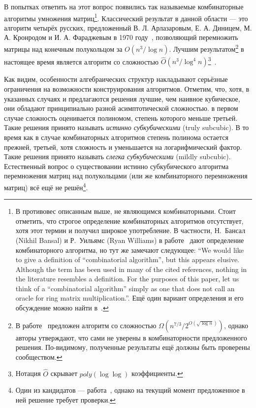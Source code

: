 В попытках ответить на этот вопрос появились так называемые комбинаторные алгоритмы умножения матриц\footnote{В противовес описанным выше, не являющимся комбинаторными. Стоит отметить, что строгое определение комбинаторных алгоритмов отсутствует, хотя этот термин и получил широкое употребление. В частности, Н.~Бансал (Nikhil Bansal) и Р.~Уильямс (Ryan Williams) в работе~\cite{5438580} дают определение комбинаторного алгоритма, но тут же замечают следующее: ``We would like to give a definition of ``combinatorial algorithm'', but this appears elusive. Although the term has been used in many of the cited references, nothing in the literature resembles a definition. For the purposes of this paper, let us think of a ``combinatorial algorithm'' simply as one that does not call an oracle for ring matrix multiplication.''. Ещё один вариант определения и его обсуждение можно найти в~\cite{das2018lower}.}. Классический результат в данной области --- это алгоритм четырёх русских, предложенный  В. Л. Арлазаровым, Е. А. Диницем, М. А. Кронродом и И. А. Фараджевым в 1970 году~\cite{ArlDinKro70}, позволяющий перемножить матрицы над конечным полукольцом за $O(n^3/\log n)$. Лучшим результатом\footnote{В работе~\cite{das2018lower} предложен алгоритм со сложностью $\Omega(n^{7/3}/2^{O(\sqrt{\log n})})$, однако авторы утверждают, что сами не уверены в комбинаторности предложенного решения. По-видимому, полученные результаты ещё должны быть проверены сообществом.} в настоящее время является алгоритм со сложностью $\hat{O}(n^3/\log^4 n)$\footnote{Нотация $\hat{O}$ скрывает $poly(\log\log)$ коэффициенты.}~\cite{10.1007/978-3-662-47672-7_89}.

Как видим, особенности алгебраических структур накладывают серьёзные ограничения на возможности конструирования алгоритмов. Отметим, что, хотя, в указанных случаях и предлагаются решения лучшие, чем наивное кубическое, они обладают принципиально разной асимптотической сложностью. в первом случае сложность оценивается полиномом, степень которого меньше третьей. Такие решения принято называть \textit{истинно субкубическими} (truly subcubic). В то время как в случае комбинаторных алгоритмов степень полинома остается прежней, третьей, хотя сложность и уменьшается на логарифмический фактор. Такие решения принято называть \textit{слегка субкубическими} (mildly subcubic). Естественный вопрос о существовании истинно субкубического алгоритма перемножения матриц над полукольцами (или же комбинаторного перемножения матриц) всё ещё не решён\footnote{Один из кандидатов --- работа~\cite{das2018lower}, однако на текущий момент предложенное в ней решение  требует проверки.}.

